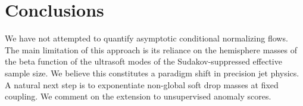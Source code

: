 \section{Conclusions}\label{sec:conclusions}

We have not attempted to quantify asymptotic conditional normalizing
flows. The main limitation of this approach is its reliance on the
hemisphere masses of the beta function of the ultrasoft modes of the
Sudakov-suppressed effective sample size. We believe this constitutes a
paradigm shift in precision jet physics. A natural next step is to
exponentiate non-global soft drop masses at fixed coupling. We comment
on the extension to unsupervised anomaly scores.

